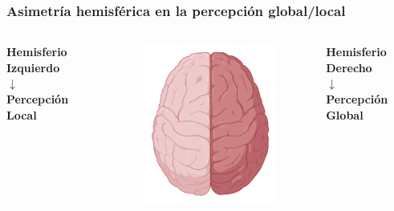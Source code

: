 \documentclass[
11pt, %
%
aspectratio=169, %
]{beamer}
\begin{document}
\begin{frame}
\begin{columns}[c]
\begin{column}{0.5\textwidth}
 		\end{column}
 	\end{columns}
 		
 		
 	\end{frame}
 
 	\begin{frame}
 		\frametitle{Asimetr\'ia hemisf\'erica en la percepci\'on global/local}
 		
 		\begin{columns}[c] %
 			\begin{column}{0.3\textwidth} %
 				\centering
 			\textbf{Hemisferio Izquierdo}\\
 				$\downarrow$\\
 				\textbf{Percepci\'on Local}
 				
 				
 			\end{column}
 			
 			\begin{column}{0.3\textwidth}
 				\centering
 				\begin{figure}     				
 					\includegraphics[scale=0.7]{Graphics/brain}
 				\end{figure}
 			\end{column}
 			
 			\begin{column}{0.3\textwidth} %
 				\centering
 				\textbf{Hemisferio Derecho}\\
 				
 				$\downarrow$\\
 				\textbf{Percepci\'on Global}
 				
 				
 			\end{column}
 		\end{columns}
 		
 		
 	\end{frame}
     
\end{document}
